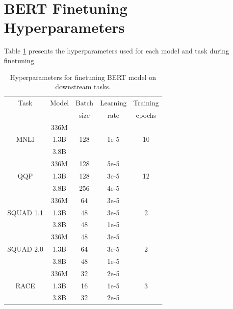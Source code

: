 
%

\section{BERT Finetuning Hyperparameters}
\label{app:berthparams}

Table \ref{tab:bert_tasks_hparams} presents the hyperparameters used for each model and task during finetuning.

\begin{table}[hbt!]
\footnotesize
\begin{center}
\caption{Hyperparameters for finetuning BERT model on downstream tasks.}
\label{tab:bert_tasks_hparams}
\begin{tabular}{c|c|c|c|c} \hline \hline
Task      & Model & Batch & Learning & Training \\
          &       & size  & rate     & epochs   \\ \hline
          & 336M  &       &          &          \\ 
MNLI      & 1.3B  & 128   & 1e-5     & 10       \\ 
          & 3.8B  &       &          &          \\ \hline 
          & 336M  &   128    & 5e-5     &          \\ 
QQP       & 1.3B  & 128   & 3e-5     & 12      \\ 
          & 3.8B  &  256     & 4e-5     &          \\ \hline 
          & 336M  & 64    & 3e-5     &          \\ 
SQUAD 1.1 & 1.3B  & 48    & 3e-5     & 2        \\ 
          & 3.8B  & 48    & 1e-5     &          \\ \hline 
          & 336M  & 48    & 3e-5     &          \\ 
SQUAD 2.0 & 1.3B  & 64    & 3e-5     & 2        \\ 
          & 3.8B  & 48    & 1e-5     &          \\ \hline 
          & 336M  & 32    & 2e-5     &          \\ 
RACE      & 1.3B  & 16   & 1e-5     & 3        \\ 
          & 3.8B  & 32    & 2e-5     &          \\ \hline 
\end{tabular}
\end{center}
\end{table}


